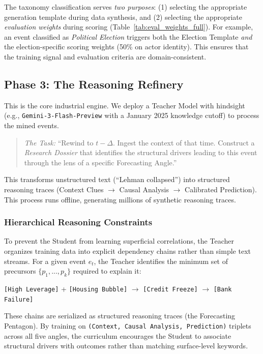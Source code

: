 \documentclass[11pt,a4paper]{article}
\begin{document}
\medskip\noindent
The taxonomy classification serves \textit{two purposes}: (1) selecting the appropriate generation template during data synthesis, and (2) selecting the appropriate \textit{evaluation weights} during scoring (Table~\ref{tab:eval_weights_full}). For example, an event classified as \textit{Political Election} triggers both the Election Template \textit{and} the election-specific scoring weights (50\% on actor identity). This ensures that the training signal and evaluation criteria are domain-consistent.

\subsection{Phase 3: The Reasoning Refinery}
\label{sec:refinery}
This is the core industrial engine. We deploy a Teacher Model with hindsight (e.g., \texttt{Gemini-3-Flash-Preview} with a January 2025 knowledge cutoff) to process the mined events.
\begin{quote}
    \textit{The Task:} ``Rewind to $t-\Delta$. Ingest the context of that time. Construct a \textit{Research Dossier} that identifies the structural drivers leading to this event through the lens of a specific Forecasting Angle.''
\end{quote}
This transforms unstructured text (``Lehman collapsed'') into structured reasoning traces (Context Clues $\to$ Causal Analysis $\to$ Calibrated Prediction).
This process runs offline, generating millions of synthetic reasoning traces.

\subsubsection{Hierarchical Reasoning Constraints}

To prevent the Student from learning superficial correlations, the Teacher organizes training data into explicit dependency chains rather than simple text streams. For a given event $e_t$, the Teacher identifies the minimum set of precursors $\{p_1, ..., p_k\}$ required to explain it:
\begin{center}
\texttt{[High Leverage]} + \texttt{[Housing Bubble]} $\longrightarrow$ \texttt{[Credit Freeze]} $\longrightarrow$ \texttt{[Bank Failure]}
\end{center}

These chains are serialized as structured reasoning traces (the Forecasting Pentagon). By training on \texttt{(Context, Causal Analysis, Prediction)} triplets across all five angles, the curriculum encourages the Student to associate structural drivers with outcomes rather than matching surface-level keywords.
\end{document}
